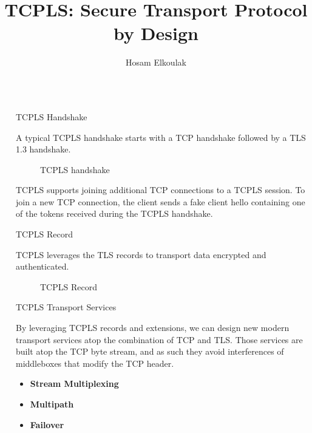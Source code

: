 \documentclass[final]{beamer}
\title{TCPLS: Secure Transport Protocol by Design}
\author{Hosam Elkoulak}
\institute[shortinst]{\inst{1} University of Namur}
\newlength{\sepwidth}
\newlength{\colwidth}
\newcommand{\separatorcolumn}{\begin{column}{\sepwidth}\end{column}}
\begin{document}
  \begin{frame}[t]
    \begin{columns}[t]
      \separatorcolumn

      \begin{column}{\colwidth}

        \begin{block}{TCPLS Handshake}

          A typical TCPLS \cite{rochet2021tcpls} handshake starts with a TCP handshake followed by a TLS 1.3 handshake.

          \begin{figure}
            \centering
            
            \caption{TCPLS handshake}
            \label{fig:tcpls-hs}
          \end{figure}

          TCPLS supports joining additional TCP connections to a TCPLS session.
          To join a new TCP connection, the client sends a fake client hello
          containing one of the tokens received during the TCPLS handshake.

        \end{block}

        \begin{block}{TCPLS Record}

          TCPLS leverages the TLS records to transport data encrypted and authenticated.

          \begin{figure}
            \centering
            
            \caption{TCPLS Record}
            \label{fig:tcpls-record}
          \end{figure}


        \end{block}
        \begin{block}{TCPLS Transport Services}

          By leveraging TCPLS records and extensions, we can design new
          modern transport services atop the combination of TCP and TLS. Those services are built atop the TCP
          byte stream, and as such they avoid interferences of middleboxes that modify the TCP header.

          \begin{itemize}
            \item \textbf{Stream Multiplexing}
            \item \textbf{Multipath}
            \item \textbf{Failover}
          \end{itemize}
        \end{block}
        \begin{figure}
          \centering
          
          \label{fig:unamur}
        \end{figure}
        \begin{figure}
          \centering
          
          \label{fig:cyberwal}
        \end{figure}


\end{column}
\end{columns}
\end{frame}
\end{document}

